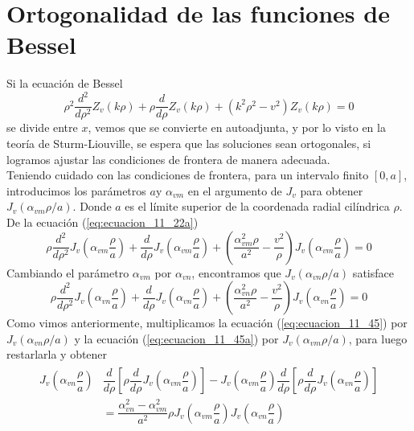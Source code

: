 \section{Ortogonalidad de las funciones de Bessel}
Si la ecuación de Bessel 
\begin{equation}
\rho^{2} \dfrac{d^{2}}{d \rho^{2}} Z_{v} (k \rho) + \rho \dfrac{d}{d \rho} Z_{v} (k \rho) + (k^{2} \rho^{2} - v^{2}) Z_{v} (k \rho) = 0
\label{eq:ecuacion_11_22a}
\end{equation}
se divide entre $x$, vemos que se convierte en autoadjunta, y por lo visto en la teoría de Sturm-Liouville, se espera que las soluciones sean ortogonales, si logramos ajustar las condiciones de frontera de manera adecuada.
\\
Teniendo cuidado con las condiciones de frontera, para un intervalo finito $[0,a]$, introducimos los parámetros $a$y $\alpha_{vm}$ en el argumento de $J_{v}$ para obtener $J_{v}(\alpha_{vm} \rho /a)$. Donde $a$ es el límite superior de la coordenada radial cilíndrica $\rho$.
\\
De la ecuación (\ref{eq:ecuacion_11_22a})
\begin{equation}
\rho \dfrac{d^{2}}{d \rho^{2}} J_{v} \left( \alpha_{vm} \dfrac{\rho}{a} \right) + \dfrac{d}{d \rho} J_{v} \left( \alpha_{vm} \dfrac{\rho}{a} \right) + \left( \dfrac{\alpha_{vm}^{2} \rho}{a^{2}} - \dfrac{v^{2}}{\rho} \right) J_{v} \left( \alpha_{vm} \dfrac{\rho}{a} \right) = 0
\label{eq:ecuacion_11_45}
\end{equation}
Cambiando el parámetro $\alpha_{vm}$ por $\alpha_{vn}$, encontramos que $J_{v}(\alpha_{vn} \rho /a)$ satisface
\begin{equation}
\rho \dfrac{d^{2}}{d \rho^{2}} J_{v} \left( \alpha_{vn} \dfrac{\rho}{a} \right) + \dfrac{d}{d \rho} J_{v} \left( \alpha_{vn} \dfrac{\rho}{a} \right) + \left( \dfrac{\alpha_{vn}^{2} \rho}{a^{2}} - \dfrac{v^{2}}{\rho} \right) J_{v} \left( \alpha_{vn} \dfrac{\rho}{a} \right) = 0
\label{eq:ecuacion_11_45a}
\end{equation}
Como vimos anteriormente, multiplicamos la ecuación (\ref{eq:ecuacion_11_45}) por $J_{v}(\alpha_{vn} \rho /a)$ y la ecuación (\ref{eq:ecuacion_11_45a}) por $J_{v}(\alpha_{vm} \rho /a)$, para luego restarlarla y obtener
\begin{eqnarray}
\begin{aligned}
J_{v} \left( \alpha_{vn} \dfrac{\rho}{a} \right) &  \dfrac{d}{d \rho} \left[ \rho \dfrac{d}{d \rho} J_{v} \left( \alpha_{vm} \dfrac{\rho}{a} \right) \right] - J_{v} \left( \alpha_{vm} \dfrac{\rho}{a} \right) \dfrac{d}{d \rho} \left[ \rho \dfrac{d}{d \rho} J_{v} \left( \alpha_{vn} \dfrac{\rho}{a} \right) \right] \\
&= \dfrac{\alpha^{2}_{vn} - \alpha^{2}_{vm}}{a^{2}} \rho J_{v} \left( \alpha_{vm} \dfrac{\rho}{a} \right) J_{v} \left( \alpha_{vn} \dfrac{\rho}{a} \right)
\end{aligned}
\label{eq:ecuacion_11_46}
\end{eqnarray}
